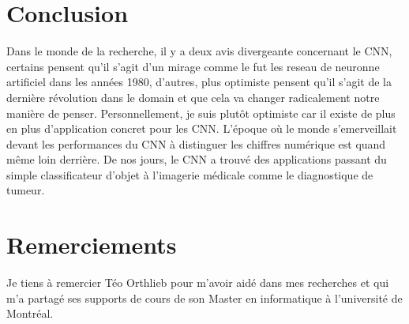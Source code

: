 \documentclass[12pt, letterpaper]{article}
\begin{document}
\section{Conclusion}
Dans le monde de la recherche, il y a deux avis divergeante concernant le CNN, certains pensent qu'il s'agit d'un mirage comme le fut les reseau de neuronne artificiel 
dans les années 1980, d'autres, plus optimiste pensent qu'il s'agit de la dernière révolution dans le domain et que cela va changer radicalement notre 
manière de penser. Personnellement, je suis plutôt optimiste car il existe de plus en plus d'application concret pour les CNN.
L'époque où le monde s'emerveillait devant les performances du CNN à distinguer les chiffres numérique est quand même loin derrière.
De nos jours, le CNN a trouvé des applications passant du simple classificateur d'objet à l'imagerie médicale comme le diagnostique de tumeur.

\section{Remerciements}
Je tiens à remercier Téo Orthlieb pour m'avoir aidé dans mes recherches et qui m'a partagé ses supports de cours de son Master en informatique à l'université de Montréal. 

\newpage
\printbibliography
\end{document}
